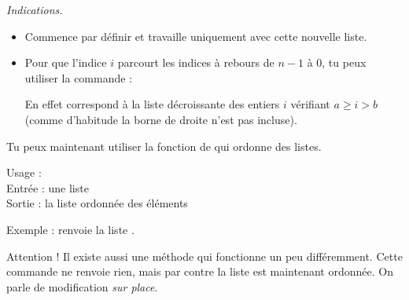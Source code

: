 \documentclass[11pt,class=report,crop=false]{standalone}
\begin{document}
\begin{activite}
\medskip

\emph{Indications.}
\begin{itemize}
  \item Commence par définir  et travaille uniquement avec cette nouvelle liste.
  \item Pour que l'indice $i$ parcourt les indices à rebours de $n-1$ à $0$, tu peux utiliser la commande : 

En effet  correspond à la liste décroissante des entiers $i$ vérifiant $a \ge i > b$ (comme d'habitude la borne de droite n'est pas incluse).
\end{itemize}

\end{activite}


\begin{cours}[Tri]

Tu peux maintenant utiliser la fonction  de \Python{} qui ordonne des listes.

 
  \begin{fonctionpython}
    Usage : \\
    Entrée : une liste  \\
    Sortie : la liste ordonnée des éléments
  
  \medskip
     
   Exemple :  renvoie la liste \ci{[4,6,6,7,8,11,12,13]}.

  \end{fonctionpython}  
  
  Attention ! Il existe aussi une méthode  qui fonctionne un peu différemment. Cette commande ne renvoie rien, mais par contre la liste  est maintenant ordonnée. On parle de modification \emph{sur place}.
\end{cours}


\end{document}

